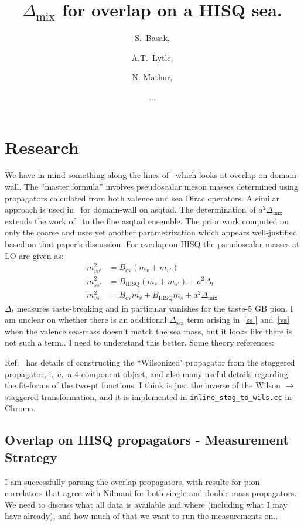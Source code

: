 \documentclass[11pt,a4paper]{article}
\title{\boldmath $\Delta_\text{mix}$ for overlap on a HISQ sea.}
\author{S.\ Basak,}
\author{A.T.\ Lytle,}
\author{N. Mathur,}
\author{...}
\begin{document}
\maketitle
\section{Research}
We have in mind something along the lines of~\cite{Lujan:2012wg} which looks at overlap
on domain-wall.  The ``master formula'' involves pseudoscalar meson masses determined
using propagators calculated from both valence and sea Dirac operators.
A similar approach is used in~\cite{Aubin:2008wk} for domain-wall on asqtad.
The determination of $a^2 \Delta_\text{mix}$ extends the work of~\cite{Orginos:2007tw} to the fine asqtad ensemble.
The prior work computed on only the coarse and uses yet another parametrization which 
appears well-justified based on that paper's discussion.
For overlap on HISQ the pseudoscalar
masses at LO are given as:
\begin{align}
m^2_{vv'} &= B_{\text{ov}} (m_v + m_{v'}) \\
m^2_{ss'} &= B_{\text{HISQ}}(m_s + m_{s'}) + a^2 \Delta_{t} \label{ss'}\\
m^2_{vs} &= B_{\text{ov}} m_v + B_{\text{HISQ}} m_s + a^2 \Delta_\text{mix} \label{vs}
\end{align}
$\Delta_t$ measures taste-breaking and in particular vanishes for the taste-5 GB pion.
I am unclear on whether there is an additional $\Delta_{\text{sea}}$ term
arising in~\eqref{ss'} and~\eqref{vs} when the valence sea-mass doesn't match the sea mass,
but it looks like there is not such a term.. I need to understand this better.
Some theory references:~\cite{Aubin:2003mg}\cite{Bar:2005tu}\cite{Chen:2006wf}

Ref.~\cite{Orginos:2007tw} has details of constructing the ``Wilsonized" propagator
from the staggered propagator, i.\ e.\ a 4-component object,
and also many useful details regarding the fit-forms of the two-pt functions.  I think is just the inverse
of the Wilson $\rightarrow$ staggered transformation, and it is implemented in {\tt inline\_stag\_to\_wils.cc} in Chroma.

\subsection{Overlap on HISQ propagators - Measurement Strategy}
I am successfully parsing the overlap propagators, with results for pion correlators that agree
with Nilmani for both single and double mass propagators.  We need to discuss what all data is available and where (including what I may have already), and how much of that we want to run the measurements on..
\end{document}
